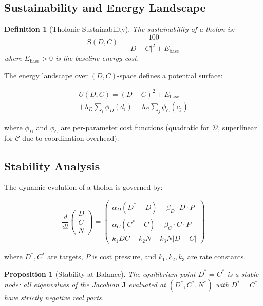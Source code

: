 \documentclass[12pt,a4paper,twocolumn]{article}
\newtheorem{proposition}[theorem]{Proposition}
\newtheorem{definition}{Definition}[section]
\newcommand{\D}{\mathcal{D}}
\newcommand{\CC}{\mathcal{C}}
\newcommand{\Sust}{\mathrm{S}}
\newcommand{\Ebase}{E_{\mathrm{base}}}
\begin{document}
\subsection{Sustainability and Energy Landscape}

\begin{definition}[Tholonic Sustainability]
\label{def:sustainability}
The sustainability of a tholon is:
\begin{equation}
\label{eq:sust}
\Sust(D, C) = \frac{100}{|D - C|^2 + \Ebase}
\end{equation}
where $\Ebase > 0$ is the baseline energy cost.
\end{definition}

The energy landscape over $(D, C)$-space defines a potential surface:

\begin{multline}
\label{eq:potential}
U(D, C) = (D {-} C)^2 + \Ebase \\
  + \lambda_D {\textstyle\sum_i} \phi_D(d_i) + \lambda_C {\textstyle\sum_j} \phi_C(c_j)
\end{multline}

where $\phi_D$ and $\phi_C$ are per-parameter cost functions (quadratic for $\D$, superlinear for $\CC$ due to coordination overhead).

\subsection{Stability Analysis}

The dynamic evolution of a tholon is governed by:

\begin{equation}
\label{eq:dynamics}
\frac{d}{dt}\begin{pmatrix} D \\ C \\ N \end{pmatrix} = \begin{pmatrix}
\alpha_D(D^* - D) - \beta_D \cdot D \cdot P \\
\alpha_C(C^* - C) - \beta_C \cdot C \cdot P \\
k_1 DC - k_2 N - k_3 N |D - C|
\end{pmatrix}
\end{equation}

where $D^*, C^*$ are targets, $P$ is cost pressure, and $k_1, k_2, k_3$ are rate constants.

\begin{proposition}[Stability at Balance]
\label{prop:stability}
The equilibrium point $D^* = C^*$ is a stable node: all eigenvalues of the Jacobian $\mathbf{J}$ evaluated at $(D^*, C^*, N^*)$ with $D^* = C^*$ have strictly negative real parts.
\end{proposition}
\end{document}
